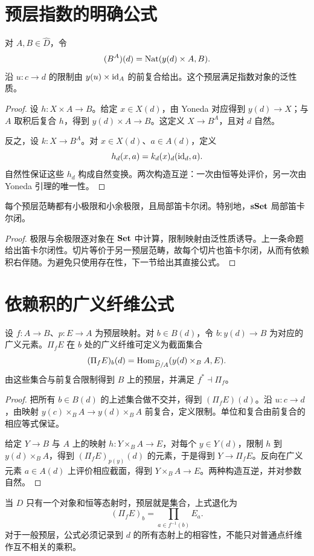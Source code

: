 \section{预层指数的明确公式}
\begin{proposition}[预层指数]
对 $A,B\in\widehat D$，令
\[
(B^A)(d)=\operatorname{Nat}(y(d)\times A,B).
\]
沿 $u:c\to d$ 的限制由 $y(u)\times\operatorname{id}_A$ 的前复合给出。这个预层满足指数对象的泛性质。
\end{proposition}
\begin{proof}
设 $h:X\times A\to B$。给定 $x\in X(d)$，由 Yoneda 对应得到 $y(d)\to X$；与 $A$ 取积后复合 $h$，得到 $y(d)\times A\to B$。这定义 $X\to B^A$，且对 $d$ 自然。

反之，设 $k:X\to B^A$。对 $x\in X(d)$、$a\in A(d)$，定义
\[
h_d(x,a)=k_d(x)_d(\operatorname{id}_d,a).
\]
自然性保证这些 $h_d$ 构成自然变换。两次构造互逆：一次由恒等处评价，另一次由 Yoneda 引理的唯一性。
\end{proof}
\begin{theorem}[预层范畴局部笛卡尔闭]
每个预层范畴都有小极限和小余极限，且局部笛卡尔闭。特别地，$\mathbf{sSet}$ 局部笛卡尔闭。
\end{theorem}
\begin{proof}
极限与余极限逐对象在 $\mathbf{Set}$ 中计算，限制映射由泛性质诱导。上一条命题给出笛卡尔闭性。切片等价于另一预层范畴，故每个切片也笛卡尔闭，从而有依赖积右伴随。为避免只使用存在性，下一节给出其直接公式。
\end{proof}

\section{依赖积的广义纤维公式}
\begin{proposition}[依赖积的表示]
设 $f:A\to B$、$p:E\to A$ 为预层映射。对 $b\in B(d)$，令 $b:y(d)\to B$ 为对应的广义元素。$\Pi_fE$ 在 $b$ 处的广义纤维可定义为截面集合
\[
(\Pi_fE)_b(d)=
\operatorname{Hom}_{\widehat D/A}(y(d)\times_BA,E).
\]
由这些集合与前复合限制得到 $B$ 上的预层，并满足 $f^*\dashv\Pi_f$。
\end{proposition}
\begin{proof}
把所有 $b\in B(d)$ 的上述集合做不交并，得到 $(\Pi_fE)(d)$。沿 $u:c\to d$，由映射 $y(c)\times_BA\to y(d)\times_BA$ 前复合，定义限制。单位和复合由前复合的相应等式保证。

给定 $Y\to B$ 与 $A$ 上的映射 $h:Y\times_BA\to E$，对每个 $y\in Y(d)$，限制 $h$ 到 $y(d)\times_BA$，得到 $(\Pi_fE)_{p(y)}(d)$ 的元素，于是得到 $Y\to\Pi_fE$。反向在广义元素 $a\in A(d)$ 上评价相应截面，得到 $Y\times_BA\to E$。两种构造互逆，并对参数自然。
\end{proof}
\begin{example}
当 $D$ 只有一个对象和恒等态射时，预层就是集合，上式退化为
\[
(\Pi_fE)_b=\prod_{a\in f^{-1}(b)}E_a.
\]
对于一般预层，公式必须记录到 $d$ 的所有态射上的相容性，不能只对普通点纤维作互不相关的乘积。
\end{example}

